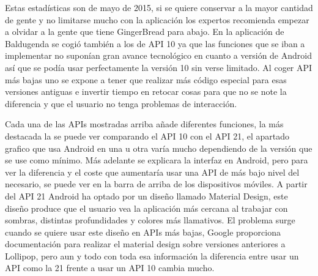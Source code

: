 Estas estadísticas son de mayo de 2015, si se quiere conservar a la mayor cantidad de gente y no limitarse mucho con la aplicación los expertos recomienda empezar a olvidar a la gente que tiene GingerBread para abajo.
En la aplicación de Baldugenda se cogió también a los de API 10 ya que las funciones que se iban a implementar no suponían gran avance tecnológico en cuanto a versión de Android así que se podía usar perfectamente la versión 10 sin verse limitado.
Al coger API más bajas uno se expone a tener que realizar más código especial para esas versiones antiguas e invertir tiempo en retocar cosas para que no se note la diferencia y que el usuario no tenga problemas de interacción.

 
Cada una de las APIs mostradas arriba añade diferentes funciones, la más destacada la se puede ver comparando el API 10 con el API 21, el apartado grafico que usa Android en una u otra varía mucho dependiendo de la versión que se use como mínimo.
Más adelante se explicara la interfaz en Android, pero para ver la diferencia y el coste que aumentaría usar una API de más bajo nivel del necesario, se puede ver en la barra de arriba de los dispositivos móviles. A partir del API 21 Android ha optado por un diseño llamado Material Design, este diseño produce que el usuario vea la aplicación más cercana al trabajar con sombras, distintas profundidades y colores más llamativos.
El problema surge cuando se quiere usar este diseño en APIs más bajas, Google proporciona documentación para realizar el material design sobre versiones anteriores a Lollipop, pero aun y todo con toda esa información la diferencia entre usar un API como la 21 frente a usar un API 10 cambia mucho.



